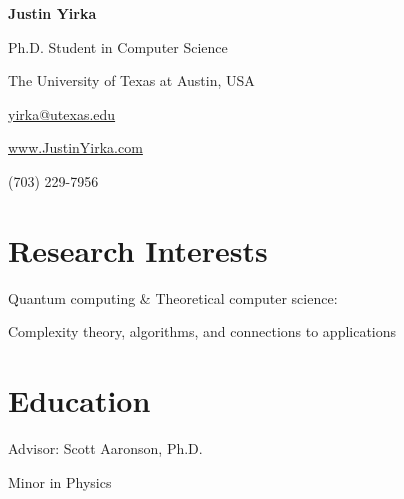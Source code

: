 \documentclass[11pt,letterpaper,serif]{moderncv}
\begin{document}
	
	
\thispagestyle{firstpage}

\begin{center}
	{\huge\textbf{Justin Yirka}}
	
	Ph.D. Student in Computer Science
	
	The University of Texas at Austin, USA
	
	\vspace{\baselineskip}
	
	\href{mailto:yirka@utexas.edu}{yirka@utexas.edu}
	
	
	\url{www.JustinYirka.com}	

	(703) 229-7956
\end{center}


\setlength{\parskip}{0.4em}

\section{Research Interests}
Quantum computing \& Theoretical computer science: 

\hspace{.25in} Complexity theory, algorithms, and connections to applications


\section{Education}
{
	\normalsize
	\begin{adjustwidth}{.25in}{}
		 Advisor: Scott Aaronson, Ph.D.
	\end{adjustwidth}
}

\vspace{-\baselineskip}\vspace{-2\parskip}
{%
}
{
	\begin{adjustwidth}{.25in}{}
		Minor in Physics %
	\end{adjustwidth}
}
\end{document}
